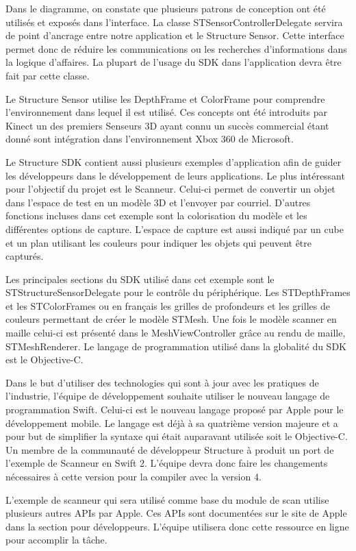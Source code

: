 \documentclass[letterpaper,twoside,12pt,french]{report}
\begin{document}
Dans le diagramme, on constate que plusieurs patrons de conception ont été utilisés et exposés dans
l'interface. La classe STSensorControllerDelegate servira de point d'ancrage entre notre
application et le Structure Sensor. Cette interface permet donc de réduire les communications ou 
les recherches d'informations dans la logique d'affaires. La plupart de l'usage du SDK dans
l'application devra être fait par cette classe. \citep*{bpse01}
\par
Le Structure Sensor utilise les DepthFrame et ColorFrame pour comprendre l'environnement dans lequel
il est utilisé. Ces concepts ont été introduits par Kinect un des premiers Senseurs 3D ayant connu
un succès commercial étant donné sont intégration dans l'environnement Xbox 360 de Microsoft.
\citep*{microsoft01}
\par
Le Structure SDK contient aussi plusieurs exemples d'application afin de guider les développeurs dans
le développement de leurs applications. Le plus intéressant pour l'objectif du projet est le
Scanneur. Celui-ci permet de convertir un objet dans l'espace de test en un modèle 3D et l'envoyer
par courriel. D'autres fonctions incluses dans cet exemple sont la colorisation du modèle et les
différentes options de capture. L'espace de capture est aussi indiqué par un cube et un plan
utilisant les couleurs pour indiquer les objets qui peuvent être capturés.
\par
Les principales sections du SDK utilisé dans cet exemple sont le STStructureSensorDelegate pour le
contrôle du périphérique. Les STDepthFrames et les STColorFrames ou en français les grilles de
profondeurs et les grilles de couleurs permettant de créer le modèle STMesh. Une fois le modèle
scanner en maille celui-ci est présenté dans le MeshViewController grâce au rendu de maille,
STMeshRenderer. Le langage de programmation utilisé dans la globalité du SDK est le Objective-C.
\par
Dans le but d'utiliser des technologies qui sont à jour avec les pratiques de l'industrie, l'équipe
de développement souhaite utiliser le nouveau langage de programmation Swift. Celui-ci est le
nouveau langage proposé par Apple pour le développement mobile. Le langage est déjà à sa quatrième
version majeure et a pour but de simplifier la syntaxe qui était auparavant utilisée soit le
Objective-C. \citep*{swift01} Un membre de la communauté de développeur Structure à produit un
port de l'exemple de Scanneur en Swift 2. L'équipe devra donc faire les changements nécessaires à
cette version pour la compiler avec la version 4. \citep*{structureScannerSwift}
\par
L'exemple de scanneur qui sera utilisé comme base du module de scan utilise plusieurs autres APIs
par Apple. Ces APIs sont documentées sur le site de Apple dans la section pour développeurs.
\citep*{appleDev} L'équipe utilisera donc cette ressource en ligne pour accomplir la tâche.
\end{document}
